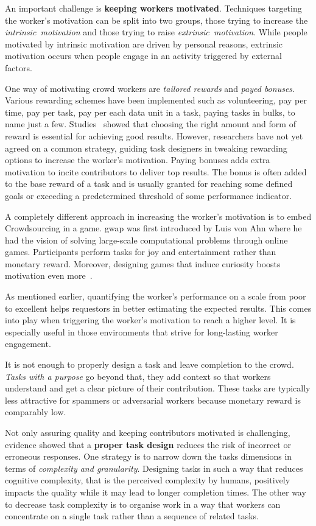 An important challenge is \textbf{keeping workers motivated}. Techniques targeting the worker's motivation can be split into two groups, those trying to increase the \emph{intrinsic~motivation} and those trying to raise \emph{extrinsic~motivation}. While people motivated by intrinsic motivation are driven by personal reasons, extrinsic motivation occurs when people engage in an activity triggered by external factors. 

One way of motivating crowd workers are \textit{tailored rewards} and \textit{payed bonuses}. Various rewarding schemes have been implemented such as volunteering, pay per time, pay per task, pay per each data unit in a task, paying tasks in bulks, to name just a few. Studies~\cite{faradani2011, ho2015} showed that choosing the right amount and form of reward is essential for achieving good results. However, researchers have not yet agreed on a common strategy, guiding task designers in tweaking rewarding options to increase the worker's motivation. 
Paying bonuses adds extra motivation to incite contributors to deliver top results. The bonus is often added to the base reward of a task and is usually granted for reaching some defined goals or exceeding a predetermined threshold of some performance indicator. 

A completely different approach in increasing the worker's motivation is to embed Crowdsourcing in a game. \gls{gwap} was first introduced by Luis von Ahn\cite{ahn2006} where he had the vision of solving large-scale computational problems through online games. Participants perform tasks for joy and entertainment rather than monetary reward. Moreover, designing games that induce curiosity boosts motivation even more~\cite{law2016}. 

As mentioned earlier, quantifying the worker's performance on a scale from poor to excellent helps requestors in better estimating the expected results. This comes into play when triggering the worker's motivation to reach a higher level. It is especially useful in those environments that strive for long-lasting worker engagement. 

It is not enough to properly design a task and leave completion to the crowd. \emph{Tasks with a purpose} go beyond that, they add context so that workers understand and get a clear picture of their contribution. These tasks are typically less attractive for spammers or adversarial workers because monetary reward is comparably low. 

Not only assuring quality and keeping contributors motivated is challenging, evidence showed that a \textbf{proper task design} reduces the risk of incorrect or erroneous responses. One strategy is to narrow down the tasks dimensions in terms of \emph{complexity and granularity}. Designing tasks in such a way that reduces cognitive complexity, that is the perceived complexity by humans, positively impacts the quality while it may lead to longer completion times. The other way to decrease task complexity is to organise work in a way that workers can concentrate on a single task rather than a sequence of related tasks.  

